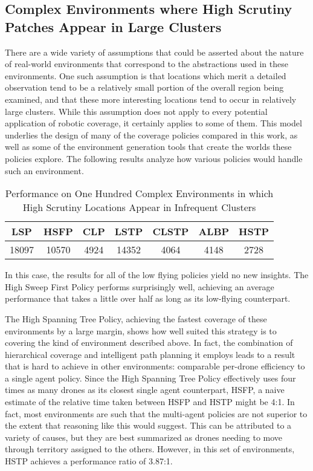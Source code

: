 \subsection{Complex Environments where High Scrutiny Patches Appear in Large Clusters}

There are a wide variety of assumptions that could be asserted about the nature of real-world environments that correspond to the abstractions used in these environments. One such assumption is that locations which merit a detailed observation tend to be a relatively small portion of the overall region being examined, and that these more interesting locations tend to occur in relatively large clusters. While this assumption does not apply to every potential application of robotic coverage, it certainly applies to some of them. This model underlies the design of many of the coverage policies compared in this work, as well as some of the environment generation tools that create the worlds these policies explore. The following results analyze how various policies would handle such an environment.

\begin{table}[h]
\begin{center}
 \begin{tabular}{||c c c c c c c ||}
 \hline
 LSP   & HSFP  & CLP  & LSTP  & CLSTP & ALBP & HSTP \\
 \hline
 18097 & 10570  & 4924 & 14352 & 4064  & 4148 & 2728 \\
 \hline
 \end{tabular}
\end{center}
\caption{Performance on One Hundred Complex Environments in which High Scrutiny Locations Appear in Infrequent Clusters}
\end{table}

In this case, the results for all of the low flying policies yield no new insights. The High Sweep First Policy performs surprisingly well, achieving an average performance that takes a little over half as long as its low-flying counterpart.

The High Spanning Tree Policy, achieving the fastest coverage of these environments by a large margin, shows how well suited this strategy is to covering the kind of environment described above. In fact, the combination of hierarchical coverage and intelligent path planning it employs leads to a result that is hard to achieve in other environments: comparable per-drone efficiency to a single agent policy. Since the High Spanning Tree Policy effectively uses four times as many drones as its closest single agent counterpart, HSFP, a naive estimate of the relative time taken between HSFP and HSTP might be 4:1. In fact, most environments are such that the multi-agent policies are not superior to the extent that reasoning like this would suggest. This can be attributed to a variety of causes, but they are best summarized as drones needing to move through territory assigned to the others. However, in this set of environments, HSTP achieves a performance ratio of 3.87:1.

